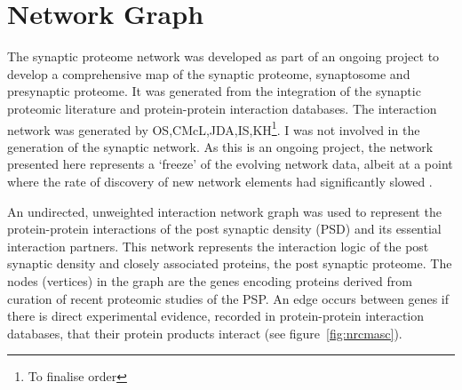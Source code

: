 \section{Network Graph}
\label{sec:network graph generation}
The synaptic proteome network was developed as part of an ongoing project to develop a comprehensive map of the synaptic proteome, synaptosome and presynaptic proteome. It was generated from the integration of the synaptic proteomic literature and protein-protein interaction databases. The interaction network was generated by OS,CMcL,JDA,IS,KH\footnote{To finalise order}. I was not involved in the generation of the synaptic network. As this is an ongoing project, the network presented here represents a `freeze' of the evolving network data, albeit at a point where the rate of discovery of new network elements had significantly slowed \cite{heil2018systems}.

An undirected, unweighted interaction network graph was used to represent the protein-protein interactions of the post synaptic density (PSD) and its essential interaction partners. This network represents the interaction logic of the post synaptic density and closely associated proteins, the post synaptic proteome. The nodes (vertices) in the graph are the genes encoding proteins derived from curation of recent proteomic studies of the PSP. An edge occurs between genes if there is direct experimental evidence, recorded in protein-protein interaction databases, that their protein products interact (see figure~\ref{fig:nrcmasc}). 

